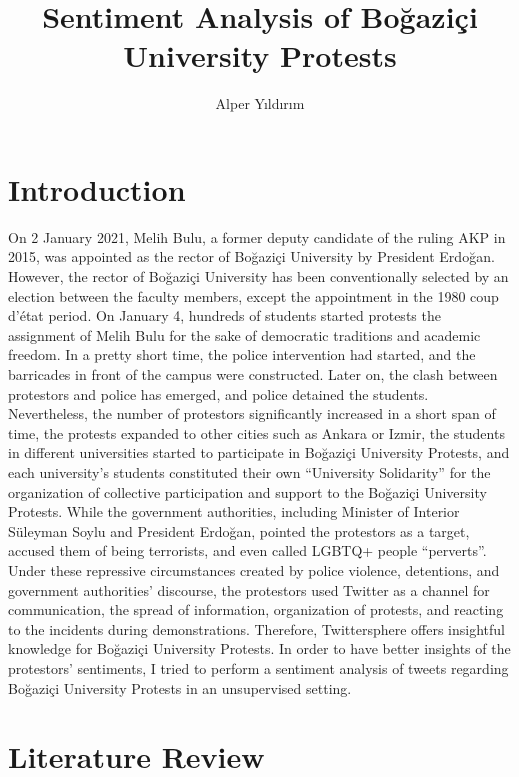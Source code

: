 \documentclass[a4paper]{article}
\title{Sentiment Analysis of Boğaziçi University Protests}
\author{Alper Yıldırım}
\begin{document}
\maketitle

\section{Introduction}


On 2 January 2021, Melih Bulu, a former deputy candidate of the ruling AKP in 2015, was appointed as the rector of Boğaziçi University by President Erdoğan. However, the rector of Boğaziçi University has been conventionally selected by an election between the faculty members, except the appointment in the 1980 coup d’état period. On January 4, hundreds of students started protests the assignment of Melih Bulu for the sake of democratic traditions and academic freedom. In a pretty short time, the police intervention had started, and the barricades in front of the campus were constructed. Later on, the clash between protestors and police has emerged, and police detained the students. \\

Nevertheless, the number of protestors significantly increased in a short span of time, the protests expanded to other cities such as Ankara or Izmir, the students in different universities started to participate in Boğaziçi University Protests, and each university’s students constituted their own “University Solidarity” for the organization of collective participation and support to the Boğaziçi University Protests. While the government authorities, including Minister of Interior Süleyman Soylu and President Erdoğan, pointed the protestors as a target, accused them of being terrorists, and even called LGBTQ+ people “perverts”. Under these repressive circumstances created by police violence, detentions, and government authorities’ discourse, the protestors used Twitter as a channel for communication, the spread of information, organization of protests, and reacting to the incidents during demonstrations. Therefore, Twittersphere offers insightful knowledge for Boğaziçi University Protests. In order to have better insights of the protestors' sentiments, I tried to perform a sentiment analysis of tweets regarding Boğaziçi University Protests in an unsupervised setting. \\ 

\section{Literature Review}
\end{document}
